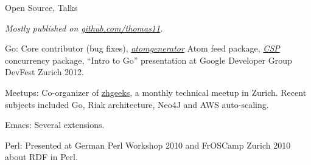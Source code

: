\begin{cv}{}
  \pagebreak

  \begin{cvlist}{Open Source, Talks}
  \item[] \emph{Mostly published on
      \href{http://github.com/thomas11}{github.com/thomas11}.}
  \item[Go:] Core contributor (bug fixes),
    \emph{\href{https://github.com/thomas11/atomgenerator}{atomgenerator}}
    Atom feed package,
    \emph{\href{https://github.com/thomas11/csp}{CSP}} concurrency
    package, ``Intro to Go'' presentation at Google Developer Group
    DevFest Zurich 2012.
  \item[Meetups:] Co-organizer of
    \href{http://www.meetup.com/zhgeeks/}{zhgeeks}, a monthly
    technical meetup in Zurich. Recent subjects included Go, Riak
    architecture, Neo4J and AWS auto-scaling.
  \item[Emacs:] Several extensions.
  \item[Perl:] Presented at German Perl Workshop 2010 and FrOSCamp
    Zurich 2010 about RDF in Perl.
  \end{cvlist}


\end{cv}
